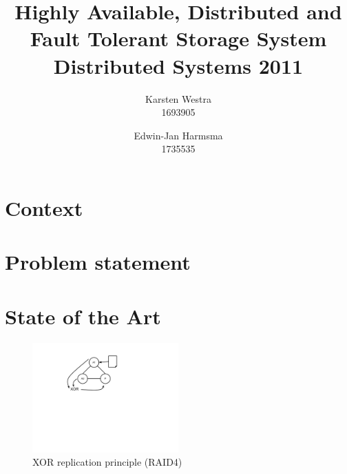 \documentclass[12pt,a4paper]{scrartcl}
\title{\large{Highly Available, Distributed and Fault Tolerant Storage System} \\ \normalsize{Distributed Systems 2011}}
\author{Karsten Westra\\1693905 \and Edwin-Jan Harmsma\\1735535}
\begin{document}
\maketitle

\tableofcontents
\clearpage



\section{Context}

\section{Problem statement}

\section{State of the Art}
\label{sec:state-of-the-art}


\begin{figure}[H]
\centering
\includegraphics[width=0.5\textwidth,trim=4cm 8cm 8cm 1cm,clip=true]{diagrams/xor-replication.pdf}
\caption{XOR replication principle (RAID4)}
\label{fig:xor-replication}
\end{figure}

\end{document}
